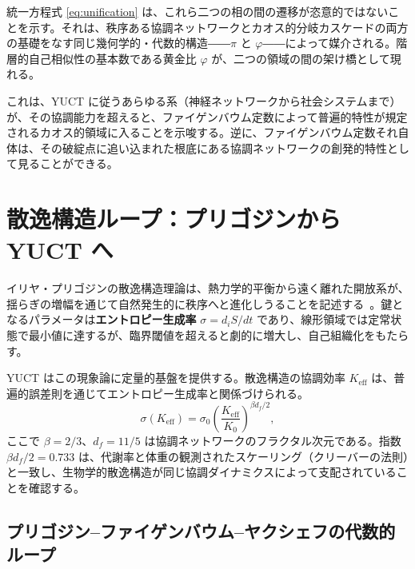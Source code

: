 \documentclass[11pt,a4paper]{article}
\newcommand{\Keff}{K_{\mathrm{eff}}}
\begin{document}
	統一方程式 \eqref{eq:unification} は、これら二つの相の間の遷移が恣意的ではないことを示す。それは、秩序ある協調ネットワークとカオス的分岐カスケードの両方の基礎をなす同じ幾何学的・代数的構造――\(\pi\) と \(\varphi\)――によって媒介される。階層的自己相似性の基本数である黄金比 \(\varphi\) が、二つの領域の間の架け橋として現れる。
	
	これは、YUCT に従うあらゆる系（神経ネットワークから社会システムまで）が、その協調能力を超えると、ファイゲンバウム定数によって普遍的特性が規定されるカオス的領域に入ることを示唆する。逆に、ファイゲンバウム定数それ自体は、その破綻点に追い込まれた根底にある協調ネットワークの創発的特性として見ることができる。
	
	\section{散逸構造ループ：プリゴジンから YUCT へ}
	\label{sec:prigogine}
	
	イリヤ・プリゴジンの散逸構造理論は、熱力学的平衡から遠く離れた開放系が、揺らぎの増幅を通じて自然発生的に秩序へと進化しうることを記述する~\cite{Prigogine1977}。鍵となるパラメータは\textbf{エントロピー生成率} \(\sigma = d_iS/dt\) であり、線形領域では定常状態で最小値に達するが、臨界閾値を超えると劇的に増大し、自己組織化をもたらす。
	
	YUCT はこの現象論に定量的基盤を提供する。散逸構造の協調効率 \(K_{\mathrm{eff}}\) は、普遍的誤差則を通じてエントロピー生成率と関係づけられる。
	\begin{equation}
		\sigma(\Keff) = \sigma_0 \left( \frac{\Keff}{K_0} \right)^{\beta d_f / 2},
		\label{eq:sigma-keff}
	\end{equation}
	ここで \(\beta = 2/3\)、\(d_f = 11/5\) は協調ネットワークのフラクタル次元である。指数 \(\beta d_f / 2 = 0.733\) は、代謝率と体重の観測されたスケーリング（クリーバーの法則）と一致し、生物学的散逸構造が同じ協調ダイナミクスによって支配されていることを確認する。
	
	\subsection{プリゴジン–ファイゲンバウム–ヤクシェフの代数的ループ}
	
\end{document}
